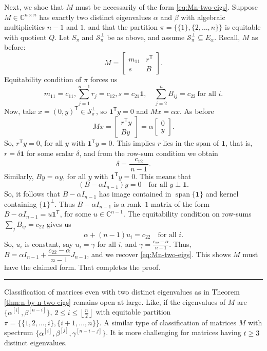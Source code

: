 \documentclass[12pt,twoside]{article}
\renewenvironment{proof}{{\noindent\bfseries Proof.}}{\qed}
\def\qed{\nolinebreak\hfill\rule{.2cm}{.2cm}\par\addvspace{.5cm}}
\begin{document}
\begin{proof}
	\medskip
	Next, we shoe that $M$ must be necessarily of the form \eqref{eq:Mn-two-eigs}. Suppose $M\in\mathbb{C}^{n\times n}$ has exactly two distinct eigenvalues $\alpha$ and $\beta$ with algebraic multiplicities $n-1$ and $1$, and that the partition $\pi=\{\{1\},\{2,\dots,n\}\}$ is equitable with quotient $Q$. Let $S_\pi$ and $\mathcal{S}_\pi^\perp$ be as above, and assume $\mathcal{S}_\pi^\perp \subseteq E_\alpha.$  Recall,   $M$ as before:
	$$
	M=\begin{bmatrix}m_{11} & r^\mathsf{T}\\ s & B\end{bmatrix}.
	$$
	Equitability condition of $\pi$  forces us
	$$
	m_{11}=c_{11},\sum_{j=1}^{n-1}r_j=c_{12},
	s=c_{21}\mathbf{1},\quad \sum_{j=2}^n B_{ij}=c_{22}\ \text{for all } i.
	$$
	Now, take $x=(0,y)^\mathsf{T}\in\mathcal{S}_\pi^\perp$, so $\mathbf{1}^\mathsf{T}y=0$ and $Mx=\alpha x$.
	As before
	$$
	Mx=\begin{bmatrix}r^\mathsf{T}y\\ By\end{bmatrix}=\alpha\begin{bmatrix}0\\y\end{bmatrix}.
	$$
	So, $r^\mathsf{T}y=0$, for all $y$ with $\mathbf{1}^\mathsf{T}y=0$. This implies $r$ lies in the span of $\mathbf{1}$, that is, $r=\delta\mathbf{1}$ for some scalar $\delta$, and from the row-sum condition we obtain
	$$
	\delta = \frac{c_{12}}{\,n-1\,}.
	$$
	Similarly, $By=\alpha y$, for all $y$ with $\mathbf{1}^\mathsf{T}y=0$. This means that
	$$
	(B-\alpha I_{n-1})y=0\quad\text{for all }y\perp \mathbf{1}.
	$$
	So, it follows that $B-\alpha I_{n-1}$ has image contained in $\operatorname{span}\{\mathbf{1}\}$ and kernel containing $\{\mathbf{1}\}^\perp$. Thus $B-\alpha I_{n-1}$ is a rank--$1$ matrix of the form
	$B-\alpha I_{n-1} = u\mathbf{1}^\mathsf{T}$,	for some $u\in\mathbb{C}^{n-1}$. The equitability condition on row-sums $\sum_{j}B_{ij}=c_{22}$ gives us
	$$
	\alpha + (n-1)u_i = c_{22}\quad\text{for all }i.
	$$
	So, $u_i$ is constant, say $u_i=\gamma$ for all $i$, and $\gamma = \frac{c_{22}-\alpha}{\,n-1\,}.$	Thus, $B = \alpha I_{n-1} + \dfrac{c_{22}-\alpha}{\,n-1\,}J_{n-1}$, and we recover \eqref{eq:Mn-two-eigs}. This shows $M$ must have the claimed form.  That completes the proof.
\end{proof}

Classification of matrices even with two distinct eigenvalues as in Theorem \ref{thm:n-by-n-two-eigs} remains open at large. Like, if the eigenvalues of $M$ are $\{\alpha^{[i]},\beta^{[n-i]}\}$, $2\leq i\leq\left \lfloor\tfrac{n}{2}\right \rfloor$ with equitable partition $\pi=\{\{1,2,\dots,i\},\{i+1,\dots,n\}\}$. A similar type of classification of matrices $M$ with spectrum $\{\alpha^{[i]},\beta^{[j]},\gamma^{[n-i-j]}\}$. It is more challenging for matrices having $t\geq 3$ distinct eigenvalues.
\end{document}
